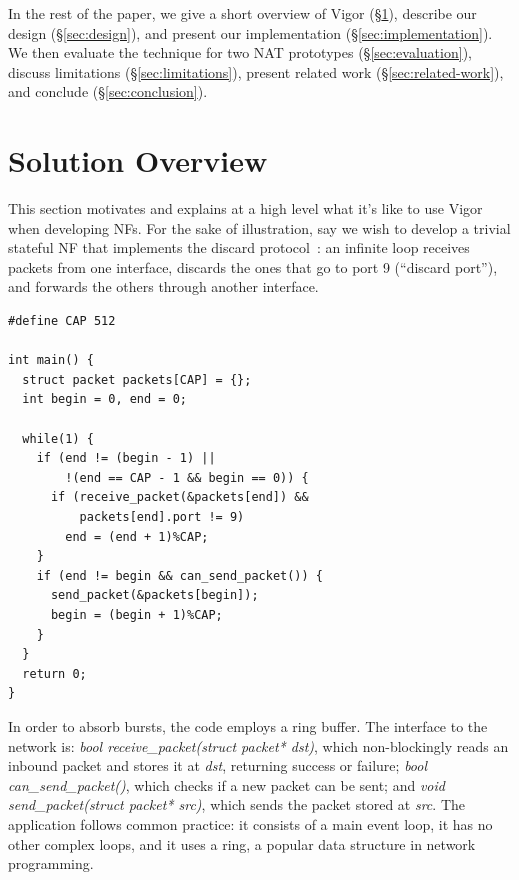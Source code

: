 \documentclass[letterpaper,twocolumn,10pt]{article}
\begin{document}
In the rest of the paper, we give a short overview of Vigor (\S\ref{sec:solution-overview}), describe our design (\S\ref{sec:design}), and present our implementation (\S\ref{sec:implementation}). We then evaluate the technique for two NAT prototypes (\S\ref{sec:evaluation}), discuss limitations (\S\ref{sec:limitations}), present related work (\S\ref{sec:related-work}), and conclude (\S\ref{sec:conclusion}).


\section{Solution Overview}
\label{sec:solution-overview}

This section motivates and explains at a high level what it's like to use Vigor when developing NFs. For the sake of illustration, say we wish to develop a trivial stateful NF that implements the discard protocol~\cite{rfc863}: an infinite loop receives packets from one interface, discards the ones that go to port 9 (``discard port''), and forwards the others through another interface.

\begin{lstlisting}
#define CAP 512

int main() {
  struct packet packets[CAP] = {};
  int begin = 0, end = 0;

  while(1) {
    if (end != (begin - 1) || 
        !(end == CAP - 1 && begin == 0)) {
      if (receive_packet(&packets[end]) && 
          packets[end].port != 9)
        end = (end + 1)%CAP;
    }
    if (end != begin && can_send_packet()) {
      send_packet(&packets[begin]);
      begin = (begin + 1)%CAP;
    }
  }
  return 0;
}

\end{lstlisting}

In order to absorb bursts, the code employs a ring buffer. The interface to the network is: {\em bool receive\_packet(struct packet* dst)}, which non-blockingly reads an inbound packet and stores it at {\em dst}, returning success or failure; {\em bool can\_send\_packet()}, which checks if a new packet can be sent; and {\em void send\_packet(struct packet* src)}, which sends the packet stored at {\em src}. The application follows common practice: it consists of a main event loop, it has no other complex loops, and it uses a ring, a popular data structure in network programming.
\end{document}
